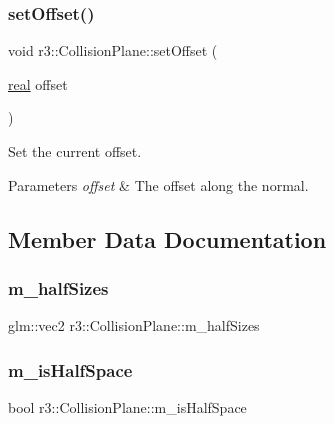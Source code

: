\subsubsection{\texorpdfstring{set\+Offset()}{setOffset()}}
{\footnotesize\ttfamily void r3\+::\+Collision\+Plane\+::set\+Offset (\begin{DoxyParamCaption}\item[{\mbox{\hyperlink{namespacer3_ab2016b3e3f743fb735afce242f0dc1eb}{real}}}]{offset }\end{DoxyParamCaption})}



Set the current offset. 


\begin{DoxyParams}{Parameters}
{\em offset} & The offset along the normal. \\
\hline
\end{DoxyParams}


\subsection{Member Data Documentation}
\mbox{\label{classr3_1_1_collision_plane_a8e642d9075ceebd029f3869ace65dd5f}} 
\subsubsection{\texorpdfstring{m\+\_\+half\+Sizes}{m\_halfSizes}}
{\footnotesize\ttfamily glm\+::vec2 r3\+::\+Collision\+Plane\+::m\+\_\+half\+Sizes\hspace{0.3cm}{\ttfamily [protected]}}

\mbox{\label{classr3_1_1_collision_plane_a6d560c5f7627efec1d094905ec4e7d60}} 
\subsubsection{\texorpdfstring{m\+\_\+is\+Half\+Space}{m\_isHalfSpace}}
{\footnotesize\ttfamily bool r3\+::\+Collision\+Plane\+::m\+\_\+is\+Half\+Space\hspace{0.3cm}{\ttfamily [protected]}}

